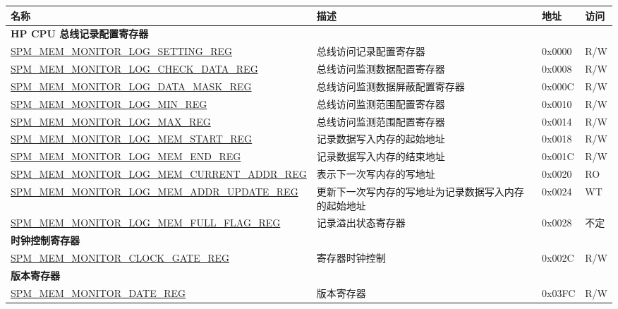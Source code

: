 \begin{longtable}{ | l | m{5cm} | l | l | }
\hline\rowcolor{lightgray}
{\bfseries 名称} & {\bfseries 描述} &  {\bfseries 地址} & {\bfseries 访问} \\ \hline
\endhead
\multicolumn{4}{|l|}{\textbf{HP CPU 总线记录配置寄存器}} \\ \hline
\hyperref[regdesc:SPMMEMMONITORLOGSETTINGREG]{SPM\_MEM\_MONITOR\_LOG\_SETTING\_REG} & 总线访问记录配置寄存器 & 0x0000 & R/W \\ \hline
\hyperref[regdesc:SPMMEMMONITORLOGCHECKDATAREG]{SPM\_MEM\_MONITOR\_LOG\_CHECK\_DATA\_REG} & 总线访问监测数据配置寄存器 & 0x0008 & R/W \\ \hline
\hyperref[regdesc:SPMMEMMONITORLOGDATAMASKREG]{SPM\_MEM\_MONITOR\_LOG\_DATA\_MASK\_REG} & 总线访问监测数据屏蔽配置寄存器 & 0x000C & R/W \\ \hline
\hyperref[regdesc:SPMMEMMONITORLOGMINREG]{SPM\_MEM\_MONITOR\_LOG\_MIN\_REG} & 总线访问监测范围配置寄存器 & 0x0010 & R/W \\ \hline
\hyperref[regdesc:SPMMEMMONITORLOGMAXREG]{SPM\_MEM\_MONITOR\_LOG\_MAX\_REG} & 总线访问监测范围配置寄存器 & 0x0014 & R/W \\ \hline
\hyperref[regdesc:SPMMEMMONITORLOGMEMSTARTREG]{SPM\_MEM\_MONITOR\_LOG\_MEM\_START\_REG} & 记录数据写入内存的起始地址 & 0x0018 & R/W \\ \hline
\hyperref[regdesc:SPMMEMMONITORLOGMEMENDREG]{SPM\_MEM\_MONITOR\_LOG\_MEM\_END\_REG} & 记录数据写入内存的结束地址 & 0x001C & R/W \\ \hline
\hyperref[regdesc:SPMMEMMONITORLOGMEMCURRENTADDRREG]{SPM\_MEM\_MONITOR\_LOG\_MEM\_CURRENT\_ADDR\_REG} & 表示下一次写内存的写地址 & 0x0020 & RO \\ \hline
\hyperref[regdesc:SPMMEMMONITORLOGMEMADDRUPDATEREG]{SPM\_MEM\_MONITOR\_LOG\_MEM\_ADDR\_UPDATE\_REG} & 更新下一次写内存的写地址为记录数据写入内存的起始地址 & 0x0024 & WT \\ \hline
\hyperref[regdesc:SPMMEMMONITORLOGMEMFULLFLAGREG]{SPM\_MEM\_MONITOR\_LOG\_MEM\_FULL\_FLAG\_REG} & 记录溢出状态寄存器 & 0x0028 & 不定 \\ \hline
\multicolumn{4}{|l|}{\textbf{时钟控制寄存器}} \\ \hline
\hyperref[regdesc:SPMMEMMONITORCLOCKGATEREG]{SPM\_MEM\_MONITOR\_CLOCK\_GATE\_REG} & 寄存器时钟控制 & 0x002C & R/W \\ \hline
\multicolumn{4}{|l|}{\textbf{版本寄存器}} \\ \hline
\hyperref[regdesc:SPMMEMMONITORDATEREG]{SPM\_MEM\_MONITOR\_DATE\_REG} & 版本寄存器 & 0x03FC & R/W \\ \hline
\end{longtable}
